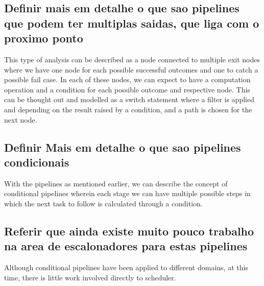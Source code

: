 \subsection{Definir mais em detalhe o que sao pipelines que podem ter multiplas saidas, que liga com o proximo ponto} 
This type of analysis can be described as a node connected to multiple exit nodes where we have one node for each possible successful outcomes and one to catch a possible fail case.
In each of these nodes, we can expect to have a computation operation and a condition for each possible outcome and respective node.
This can be thought out and modelled as a switch statement where a filter is applied and depending on the result raised by a condition, and a path is chosen for the next node. 

\subsection{Definir Mais em detalhe o que sao pipelines condicionais}
With the pipelines as mentioned earlier, we can describe the concept of conditional pipelines wherein each stage we can have multiple possible steps in which the next task to follow is calculated through a condition.

\subsection{Referir que ainda existe muito pouco trabalho na area de escalonadores para estas pipelines}
Although conditional pipelines have been applied to different domains, at this time, there is little work involved directly to scheduler.